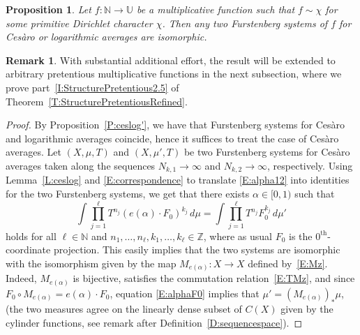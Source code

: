 \documentclass[11pt]{amsart}
\newtheorem{proposition}[lemma]{Proposition}
\theoremstyle{definition}
\newtheorem*{remark}{Remark}
\newcommand{\N}{{\mathbb N}}
\newcommand{\Z}{{\mathbb Z}}
\newcommand{\U}{{\mathbb U}}
\begin{document}
\begin{proposition}\label{P:isomorphic}
	Let $f\colon \N\to \U$ be a  multiplicative function such that $f\sim \chi$ for some primitive Dirichlet character $\chi$.
 Then any two Furstenberg systems of $f$ for Ces\`aro or logarithmic  averages are isomorphic.
\end{proposition}
\begin{remark}
With substantial additional effort, the result will be  extended  to arbitrary pretentious multiplicative functions in the next subsection, where we prove part~\eqref{I:StructurePretentious2.5} of Theorem~\ref{T:StructurePretentiousRefined}.
	\end{remark}
\begin{proof}
	By Proposition~\ref{P:ceslog'}, we have that Furstenberg systems for Ces\`aro and logarithmic averages coincide, hence it suffices to treat the case of Ces\`aro averages.
Let $(X,\mu,T)$ and $(X,\mu',T)$ be two Furstenberg systems for Ces\`aro averages taken along the sequences $N_{k,1}\to \infty$ and $N_{k,2}\to \infty$, respectively. %
Using  Lemma~\ref{L:ceslog} and  \eqref{E:correspondence} to translate \eqref{E:alpha12} into identities for the two  Furstenberg systems, we get that there exists $\alpha\in [0,1)$ such that
\begin{equation}\label{E:alphaF0}
\int \prod_{j=1}^\ell T^{n_j}(e(\alpha)\cdot F_0)^{k_j}\, d\mu=\int \prod_{j=1}^\ell T^{n_j} F_0^{k_j}\, d\mu'
\end{equation}
holds for all $\ell\in \N$ and $n_1,\ldots, n_\ell, k_1,\ldots, k_\ell\in \Z$, where as usual $F_0$ is the $0^{\text{th}}$-coordinate projection. This easily implies that the two systems are isomorphic with the isomorphism given by the map $M_{e(\alpha)}\colon X\to X$ defined by~\eqref{E:Mz}. Indeed,  $M_{e(\alpha)}$ is bijective, satisfies the commutation relation~\eqref{E:TMz}, and since  $F_0\circ M_{e(\alpha)}=e(\alpha)\cdot F_0$, equation \eqref{E:alphaF0} implies that $\mu'= (M_{e(\alpha)})_\ast\mu$, (the two measures agree on the linearly dense subset of $C(X)$ given by the cylinder functions, see remark after Definition~\ref{D:sequencespace}).
\end{proof}
\end{document}
